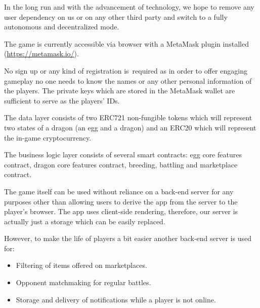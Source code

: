 \documentclass[12pt]{article}
\begin{document}
In the long run and with the advancement of technology, we hope to remove any user dependency on us or on any other third party and switch to a fully autonomous and decentralized mode.\par

The game is currently accessible via browser with a MetaMask plugin installed (\href{https://metamask.io/}{\textcolor[HTML]{1155CC}{\uline{https://metamask.io/}}}).\par

No sign up or any kind of registration is\ required as in order to offer engaging gameplay no one  needs to know the names or any other personal information of the players. The private keys which are stored in the MetaMask wallet are sufficient to serve as the players’ IDs.\par

The data layer consists of two ERC721  \cite{Ethereum_2017_Sep_26}  non-fungible tokens which will represent two states of a dragon (an egg and a dragon) and an ERC20  \cite{Ethereum_2015_Nov_19}  which will represent the in-game cryptocurrency. \par

The business logic layer consists of several smart contracts: egg core features contract, dragon core features contract, breeding, battling and marketplace contract.\par

The game itself can be used without reliance on a back-end server for any purposes other than allowing users to derive the app from the server to the player’s browser. The app uses client-side rendering, therefore, our server is actually just a storage which can be easily replaced.\par

\begin{samepage}
However, to make the life of players a bit easier another back-end server is used for:\par

\begin{itemize}
	\item Filtering of items offered on marketplaces.\par

	\item Opponent matchmaking for regular battles.\par

	\item Storage and delivery of notifications while a player is not online.
\end{itemize}\par
\end{samepage}
\end{document}
